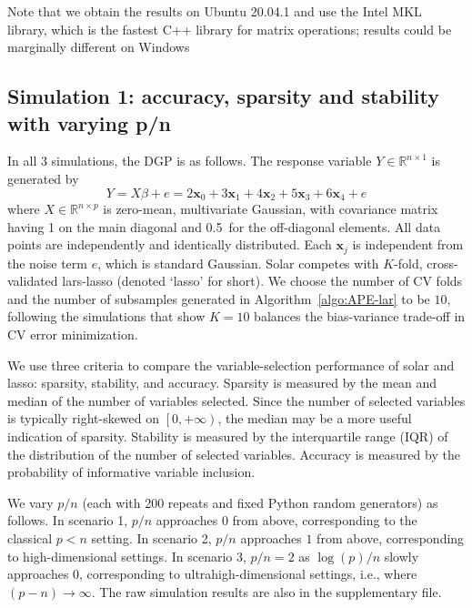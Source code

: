 \documentclass[12pt]{article}
\begin{document}
Note that we obtain the results on Ubuntu 20.04.1 and use the Intel MKL library, which is the fastest C++ library for matrix operations; results could be marginally different on Windows

\subsection{Simulation 1: accuracy, sparsity and stability with varying p/n \label{subsection:suml1}}

In all 3 simulations, the DGP is as follows. The response variable $Y \in \mathbb{R}^{n \times 1}$ is generated by
%
\begin{equation}
%
  Y =  X\beta + e = 2 \mathbf{x}_0 + 3 \mathbf{x}_1 + 4 \mathbf{x}_2 + 5 \mathbf{x}_3 + 6 \mathbf{x}_4  + e
  \label{eqn:pop_model}
\end{equation}
%
where $X \in \mathbb{R}^{n \times p}$ is zero-mean, multivariate Gaussian, with covariance matrix having 1 on the main diagonal and 0.5~for the off-diagonal elements. All data points are independently and identically distributed. Each $\mathbf{x}_j$ is independent from the noise term $e$, which is standard Gaussian. Solar competes with $K$-fold, cross-validated lars-lasso (denoted `lasso' for short). We choose the number of CV folds and the number of subsamples generated in Algorithm~\ref{algo:APE-lar} to be $10$, following the \citet{friedman2001elements} simulations that show $K = 10$ balances the bias-variance trade-off in CV error minimization.

We use three criteria to compare the variable-selection performance of solar and lasso: sparsity, stability, and accuracy. Sparsity is measured by the mean and median of the number of variables selected. Since the number of selected variables is typically right-skewed on $\left[ 0, +\infty \right)$, the median may be a more useful indication of sparsity. Stability is measured by the interquartile range (IQR) of the distribution of the number of selected variables. Accuracy is measured by the probability of informative variable inclusion.

We vary $p/n$ (each with 200 repeats and fixed Python random generators) as follows. In scenario 1, $p/n$ approaches $0$ from above, corresponding to the classical $p<n$ setting. In scenario 2, $p/n$ approaches $1$ from above, corresponding to high-dimensional settings. In scenario 3, $p/n=2$ as $\log(p)/n$ slowly approaches $0$, corresponding to ultrahigh-dimensional settings, i.e., where $(p-n)\rightarrow\infty$. The raw simulation results are also in the supplementary file.
\end{document}
